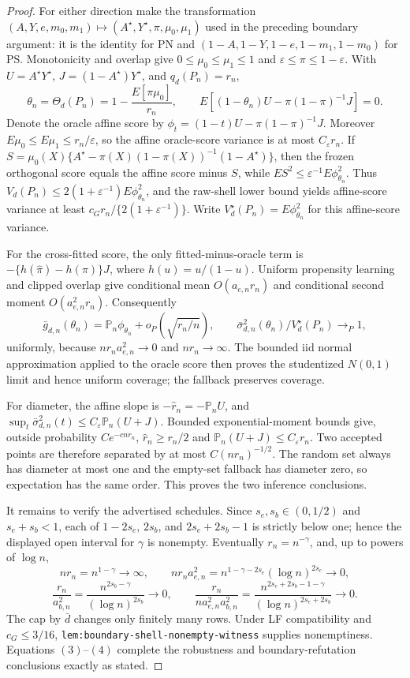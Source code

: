 \documentclass{article}
\begin{document}
\begin{proof}
For either direction make the transformation \((A,Y,e,m_0,m_1)\mapsto(A^\star,Y^\star,\pi,\mu_0,\mu_1)\) used in the preceding boundary argument: it is the identity for PN and \((1-A,1-Y,1-e,1-m_1,1-m_0)\) for PS. Monotonicity and overlap give \(0\le\mu_0\le\mu_1\le1\) and \(\varepsilon\le\pi\le1-\varepsilon\). With \(U=A^\star Y^\star\), \(J=(1-A^\star)Y^\star\), and \(q_d(P_n)=r_n\),
\[\theta_n=\Theta_d(P_n)=1-\frac{E[\pi\mu_0]}{r_n},\qquad E[(1-\theta_n)U-\pi(1-\pi)^{-1}J]=0.\tag{1}\]
Denote the oracle affine score by \(\phi_t=(1-t)U-\pi(1-\pi)^{-1}J\). Moreover \(E\mu_0\le E\mu_1\le r_n/\varepsilon\), so the affine oracle-score variance is at most \(C_\varepsilon r_n\). If \(S=\mu_0(X)\{A^\star-\pi(X)(1-\pi(X))^{-1}(1-A^\star)\}\), then the frozen orthogonal score equals the affine score minus \(S\), while \(ES^2\le\varepsilon^{-1}E\phi_{\theta_n}^2\). Thus \(V_d(P_n)\le2(1+\varepsilon^{-1})E\phi_{\theta_n}^2\), and the raw-shell lower bound yields affine-score variance at least \(c_Gr_n/\{2(1+\varepsilon^{-1})\}\). Write \(V_d^\star(P_n)=E\phi_{\theta_n}^2\) for this affine-score variance.

For the cross-fitted score, the only fitted-minus-oracle term is \(-\{h(\widehat\pi)-h(\pi)\}J\), where \(h(u)=u/(1-u)\). Uniform propensity learning and clipped overlap give conditional mean \(O(a_{e,n}r_n)\) and conditional second moment \(O(a_{e,n}^2r_n)\). Consequently
\[\bar g_{d,n}(\theta_n)=\mathbb P_n\phi_{\theta_n}+o_P(\sqrt{r_n/n}),\qquad \bar\sigma_{d,n}^2(\theta_n)/V_d^\star(P_n)\to_P1,\tag{2}\]
uniformly, because \(nr_na_{e,n}^2\to0\) and \(nr_n\to\infty\). The bounded iid normal approximation applied to the oracle score then proves the studentized \(N(0,1)\) limit and hence uniform coverage; the fallback preserves coverage.

For diameter, the affine slope is \(-\widehat r_n=-\mathbb P_nU\), and \(\sup_t\bar\sigma_{d,n}^2(t)\le C_\varepsilon\mathbb P_n(U+J)\). Bounded exponential-moment bounds give, outside probability \(Ce^{-cnr_n}\), \(\widehat r_n\ge r_n/2\) and \(\mathbb P_n(U+J)\le C_\varepsilon r_n\). Two accepted points are therefore separated by at most \(C(nr_n)^{-1/2}\). The random set always has diameter at most one and the empty-set fallback has diameter zero, so expectation has the same order. This proves the two inference conclusions.

It remains to verify the advertised schedules. Since \(s_e,s_b\in(0,1/2)\) and \(s_e+s_b<1\), each of \(1-2s_e\), \(2s_b\), and \(2s_e+2s_b-1\) is strictly below one; hence the displayed open interval for \(\gamma\) is nonempty. Eventually \(r_n=n^{-\gamma}\), and, up to powers of \(\log n\),
\[nr_n=n^{1-\gamma}\to\infty,\qquad nr_na_{e,n}^2=n^{1-\gamma-2s_e}(\log n)^{2s_e}\to0,\tag{3}\]
\[\frac{r_n}{a_{b,n}^2}=\frac{n^{2s_b-\gamma}}{(\log n)^{2s_b}}\to0,\qquad \frac{r_n}{na_{e,n}^2a_{b,n}^2}=\frac{n^{2s_e+2s_b-1-\gamma}}{(\log n)^{2s_e+2s_b}}\to0.\tag{4}\]
The cap by \(\bar d\) changes only finitely many rows. Under LF compatibility and \(c_G\le3/16\), \texttt{lem:boundary-shell-nonempty-witness} supplies nonemptiness. Equations \((3)\)--\((4)\) complete the robustness and boundary-refutation conclusions exactly as stated.
\end{proof}
\end{document}
